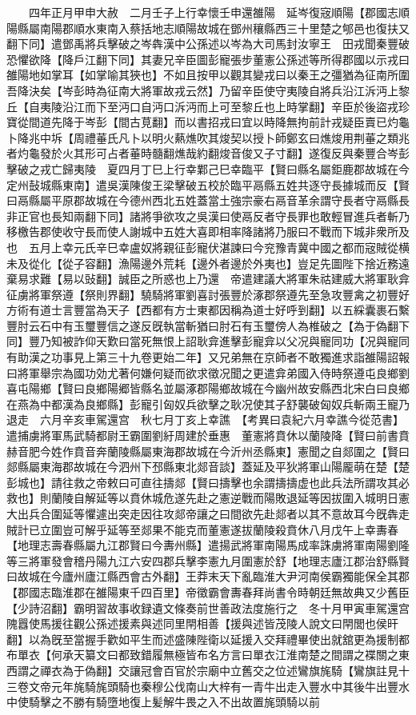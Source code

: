 　　四年正月甲申大赦　二月壬子上行幸懷壬申還雒陽　延岑復宼順陽【郡國志順陽縣屬南陽郡順水東南入蔡括地志順陽故城在鄧州穰縣西三十里楚之郇邑也復扶又翻下同】遣鄧禹將兵擊破之岑犇漢中公孫述以岑為大司馬封汝寧王　田戎聞秦豐破恐懼欲降【降戶江翻下同】其妻兄辛臣圖彭寵張步董憲公孫述等所得郡國以示戎曰雒陽地如掌耳【如掌喻其狹也】不如且按甲以觀其變戎曰以秦王之彊猶為征南所圍吾降決矣【岑彭時為征南大將軍故戎云然】乃留辛臣使守夷陵自將兵沿江泝沔上黎丘【自夷陵沿江而下至沔口自沔口泝沔而上可至黎丘也上時掌翻】辛臣於後盜戎珍寶從間道先降于岑彭【間古莧翻】而以書招戎曰宜以時降無拘前計戎疑臣賣已灼龜卜降兆中坼【周禮菙氏凡卜以明火爇燋吹其焌契以授卜師鄭玄曰燋焌用荆菙之類兆者灼龜發於火其形可占者菙時髓翻燋哉約翻焌音俊又子寸翻】遂復反與秦豐合岑彭擊破之戎亡歸夷陵　夏四月丁巳上行幸鄴己巳幸臨平【賢曰縣名屬鉅鹿郡故城在今定州鼔城縣東南】遣吳漢陳俊王梁擊破五校於臨平鬲縣五姓共逐守長據城而反【賢曰鬲縣屬平原郡故城在今德州西北五姓蓋當土強宗豪右鬲音革余謂守長者守鬲縣長非正官也長知兩翻下同】諸將爭欲攻之吳漢曰使鬲反者守長罪也敢輕冒進兵者斬乃移檄告郡使收守長而使人謝城中五姓大喜即相率降諸將乃服曰不戰而下城非衆所及也　五月上幸元氏辛巳幸盧奴將親征彭寵伏湛諫曰今兖豫青冀中國之都而宼賊從横未及從化【從子容翻】漁陽邊外荒耗【邊外者邊於外夷也】豈足先圖陛下捨近務遠棄易求難【易以䜴翻】誠臣之所惑也上乃還　帝遣建議大將軍朱祜建威大將軍耿弇征虜將軍祭遵【祭則界翻】驍騎將軍劉喜討張豐於涿郡祭遵先至急攻豐禽之初豐好方術有道士言豐當為天子【西都有方士東都因稱為道士好呼到翻】以五綵囊裹石繫豐肘云石中有玉璽豐信之遂反旣執當斬猶曰肘石有玉璽傍人為椎破之【為于偽翻下同】豐乃知被詐仰天歎曰當死無恨上詔耿弇進擊彭寵弇以父况與寵同功【况與寵同有助漢之功事見上第三十九卷更始二年】又兄弟無在京師者不敢獨進求詣雒陽詔報曰將軍舉宗為國功効尤著何嫌何疑而欲求徵况聞之更遣弇弟國入侍時祭遵屯良鄉劉喜屯陽鄉【賢曰良鄉陽郷皆縣名並屬涿郡陽鄉故城在今幽州故安縣西北宋白曰良鄉在燕為中都漢為良鄉縣】彭寵引匈奴兵欲擊之耿况使其子舒襲破匈奴兵斬兩王寵乃退走　六月辛亥車駕還宫　秋七月丁亥上幸譙　【考異曰袁紀六月幸譙今從范書】遣捕虜將軍馬武騎都尉王霸圍劉紆周建於垂惠　董憲將賁休以蘭陵降【賢曰前書賁赫音肥今姓作賁音奔蘭陵縣屬東海郡故城在今沂州丞縣東】憲聞之自郯圍之【賢曰郯縣屬東海郡故城在今泗州下邳縣東北郯音談】蓋延及平狄將軍山陽龎萌在楚【楚彭城也】請往救之帝敕曰可直往擣郯【賢曰擣擊也余謂擣擣虚也此兵法所謂攻其必救也】則蘭陵自解延等以賁休城危遂先赴之憲逆戰而陽敗退延等因拔圍入城明日憲大出兵合圍延等懼遽出突走因往攻郯帝讓之曰間欲先赴郯者以其不意故耳今旣犇走賊計已立圍豈可解乎延等至郯果不能克而董憲遂拔蘭陵殺賁休八月戊午上幸夀春【地理志壽春縣屬九江郡賢曰今夀州縣】遣揚武將軍南陽馬成率誅虜將軍南陽劉隆等三將軍發會稽丹陽九江六安四郡兵擊李憲九月圍憲於舒【地理志廬江郡治舒縣賢曰故城在今廬州廬江縣西會古外翻】王莽末天下亂臨淮大尹河南侯霸獨能保全其郡【郡國志臨淮郡在雒陽東千四百里】帝徵霸會夀春拜尚書令時朝廷無故典又少舊臣【少詩沼翻】霸明習故事收録遺文條奏前世善政法度施行之　冬十月甲寅車駕還宫　隗囂使馬援往觀公孫述援素與述同里閈相善【援與述皆茂陵人說文曰閈閭也侯旰翻】以為旣至當握手歡如平生而述盛陳陛衛以延援入交拜禮畢使出就舘更為援制都布單衣【何承天纂文曰都致錯履無極皆布名方言曰單衣江淮南楚之間謂之褋關之東西謂之禪衣為于偽翻】交讓冠會百官於宗廟中立舊交之位述鸞旗旄騎【鸞旗註見十三卷文帝元年旄騎旄頭騎也秦穆公伐南山大梓有一青牛出走入豐水中其後牛出豐水中使騎擊之不勝有騎墮地復上髪解牛畏之入不出故置旄頭騎以前